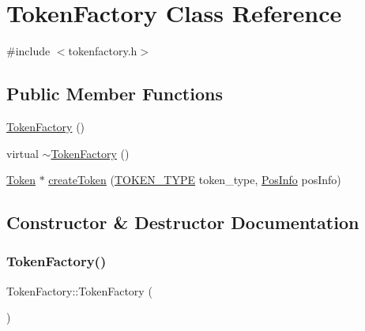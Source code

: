 \hypertarget{classTokenFactory}{}\section{Token\+Factory Class Reference}
\label{classTokenFactory}


{\ttfamily \#include $<$tokenfactory.\+h$>$}

\subsection*{Public Member Functions}
\begin{DoxyCompactItemize}
\item 
\hyperlink{classTokenFactory_acacd2ebeaa73671e0f3d7f7110835205}{Token\+Factory} ()
\item 
virtual \hyperlink{classTokenFactory_a5c78c20cdb504edd2003051d7daee759}{$\sim$\+Token\+Factory} ()
\item 
\hyperlink{classToken}{Token} $\ast$ \hyperlink{classTokenFactory_a8cd2afd2f2a645e6ad542a6b10d2ea6b}{create\+Token} (\hyperlink{statics_8h_adb8e9416fa8b5ea4961e9f171db14133}{T\+O\+K\+E\+N\+\_\+\+T\+Y\+PE} token\+\_\+type, \hyperlink{classPosInfo}{Pos\+Info} pos\+Info)
\end{DoxyCompactItemize}


\subsection{Constructor \& Destructor Documentation}
\mbox{\label{classTokenFactory_acacd2ebeaa73671e0f3d7f7110835205}} 
\subsubsection{\texorpdfstring{Token\+Factory()}{TokenFactory()}}
{\footnotesize\ttfamily Token\+Factory\+::\+Token\+Factory (\begin{DoxyParamCaption}{ }\end{DoxyParamCaption})}

\mbox{\label{classTokenFactory_a5c78c20cdb504edd2003051d7daee759}} 
